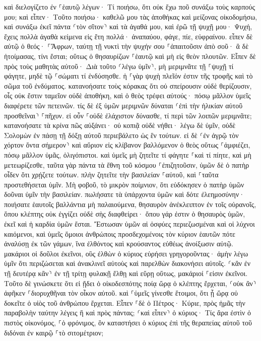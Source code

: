 \documentclass[twoside, 9pt]{extreport}
\begin{document}
καὶ διελογίζετο ἐν ⸀ἑαυτῷ λέγων· Τί ποιήσω, ὅτι οὐκ ἔχω ποῦ συνάξω τοὺς καρπούς μου; 
καὶ εἶπεν· Τοῦτο ποιήσω· καθελῶ μου τὰς ἀποθήκας καὶ μείζονας οἰκοδομήσω, καὶ συνάξω ἐκεῖ πάντα ⸂τὸν σῖτον⸃ καὶ τὰ ἀγαθά μου, 
καὶ ἐρῶ τῇ ψυχῇ μου· Ψυχή, ἔχεις πολλὰ ἀγαθὰ κείμενα εἰς ἔτη πολλά· ἀναπαύου, φάγε, πίε, εὐφραίνου. 
εἶπεν δὲ αὐτῷ ὁ θεός· ⸀Ἄφρων, ταύτῃ τῇ νυκτὶ τὴν ψυχήν σου ⸀ἀπαιτοῦσιν ἀπὸ σοῦ· ἃ δὲ ἡτοίμασας, τίνι ἔσται; 
οὕτως ὁ θησαυρίζων ⸀ἑαυτῷ καὶ μὴ εἰς θεὸν πλουτῶν. 
Εἶπεν δὲ πρὸς τοὺς μαθητὰς αὐτοῦ· Διὰ τοῦτο ⸂λέγω ὑμῖν⸃, μὴ μεριμνᾶτε τῇ ⸀ψυχῇ τί φάγητε, μηδὲ τῷ ⸀σώματι τί ἐνδύσησθε. 
ἡ ⸀γὰρ ψυχὴ πλεῖόν ἐστιν τῆς τροφῆς καὶ τὸ σῶμα τοῦ ἐνδύματος. 
κατανοήσατε τοὺς κόρακας ὅτι οὐ σπείρουσιν οὐδὲ θερίζουσιν, οἷς οὐκ ἔστιν ταμεῖον οὐδὲ ἀποθήκη, καὶ ὁ θεὸς τρέφει αὐτούς· πόσῳ μᾶλλον ὑμεῖς διαφέρετε τῶν πετεινῶν. 
τίς δὲ ἐξ ὑμῶν μεριμνῶν δύναται ⸂ἐπὶ τὴν ἡλικίαν αὐτοῦ προσθεῖναι⸃ ⸀πῆχυν. 
εἰ οὖν ⸀οὐδὲ ἐλάχιστον δύνασθε, τί περὶ τῶν λοιπῶν μεριμνᾶτε; 
κατανοήσατε τὰ κρίνα πῶς αὐξάνει· οὐ κοπιᾷ οὐδὲ νήθει· λέγω δὲ ὑμῖν, οὐδὲ Σολομὼν ἐν πάσῃ τῇ δόξῃ αὐτοῦ περιεβάλετο ὡς ἓν τούτων. 
εἰ δὲ ⸂ἐν ἀγρῷ τὸν χόρτον ὄντα σήμερον⸃ καὶ αὔριον εἰς κλίβανον βαλλόμενον ὁ θεὸς οὕτως ⸀ἀμφιέζει, πόσῳ μᾶλλον ὑμᾶς, ὀλιγόπιστοι. 
καὶ ὑμεῖς μὴ ζητεῖτε τί φάγητε ⸀καὶ τί πίητε, καὶ μὴ μετεωρίζεσθε, 
ταῦτα γὰρ πάντα τὰ ἔθνη τοῦ κόσμου ⸀ἐπιζητοῦσιν, ὑμῶν δὲ ὁ πατὴρ οἶδεν ὅτι χρῄζετε τούτων. 
πλὴν ζητεῖτε τὴν βασιλείαν ⸀αὐτοῦ, καὶ ⸀ταῦτα προστεθήσεται ὑμῖν. 
Μὴ φοβοῦ, τὸ μικρὸν ποίμνιον, ὅτι εὐδόκησεν ὁ πατὴρ ὑμῶν δοῦναι ὑμῖν τὴν βασιλείαν. 
πωλήσατε τὰ ὑπάρχοντα ὑμῶν καὶ δότε ἐλεημοσύνην· ποιήσατε ἑαυτοῖς βαλλάντια μὴ παλαιούμενα, θησαυρὸν ἀνέκλειπτον ἐν τοῖς οὐρανοῖς, ὅπου κλέπτης οὐκ ἐγγίζει οὐδὲ σὴς διαφθείρει· 
ὅπου γάρ ἐστιν ὁ θησαυρὸς ὑμῶν, ἐκεῖ καὶ ἡ καρδία ὑμῶν ἔσται. 
Ἔστωσαν ὑμῶν αἱ ὀσφύες περιεζωσμέναι καὶ οἱ λύχνοι καιόμενοι, 
καὶ ὑμεῖς ὅμοιοι ἀνθρώποις προσδεχομένοις τὸν κύριον ἑαυτῶν πότε ἀναλύσῃ ἐκ τῶν γάμων, ἵνα ἐλθόντος καὶ κρούσαντος εὐθέως ἀνοίξωσιν αὐτῷ. 
μακάριοι οἱ δοῦλοι ἐκεῖνοι, οὓς ἐλθὼν ὁ κύριος εὑρήσει γρηγοροῦντας· ἀμὴν λέγω ὑμῖν ὅτι περιζώσεται καὶ ἀνακλινεῖ αὐτοὺς καὶ παρελθὼν διακονήσει αὐτοῖς. 
⸂κἂν ἐν τῇ δευτέρᾳ κἂν⸃ ἐν τῇ τρίτῃ φυλακῇ ἔλθῃ καὶ εὕρῃ οὕτως, μακάριοί ⸀εἰσιν ἐκεῖνοι. 
Τοῦτο δὲ γινώσκετε ὅτι εἰ ᾔδει ὁ οἰκοδεσπότης ποίᾳ ὥρᾳ ὁ κλέπτης ἔρχεται, ⸂οὐκ ἂν⸃ ἀφῆκεν ⸀διορυχθῆναι τὸν οἶκον αὐτοῦ. 
καὶ ⸀ὑμεῖς γίνεσθε ἕτοιμοι, ὅτι ᾗ ὥρᾳ οὐ δοκεῖτε ὁ υἱὸς τοῦ ἀνθρώπου ἔρχεται. 
Εἶπεν ⸀δὲ ὁ Πέτρος· Κύριε, πρὸς ἡμᾶς τὴν παραβολὴν ταύτην λέγεις ἢ καὶ πρὸς πάντας; 
⸂καὶ εἶπεν⸃ ὁ κύριος· Τίς ἄρα ἐστὶν ὁ πιστὸς οἰκονόμος, ⸀ὁ φρόνιμος, ὃν καταστήσει ὁ κύριος ἐπὶ τῆς θεραπείας αὐτοῦ τοῦ διδόναι ἐν καιρῷ ⸀τὸ σιτομέτριον; 
\end{document}
